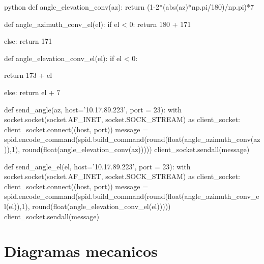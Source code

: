 \begin{appendixs}
\begin{sourcecode}[]{python}{}
def angle_elevation_conv(az):
    return (1-2*(abs(az)*np.pi/180)/np.pi)*7

def angle_azimuth_conv_el(el):
    if el < 0:
        return 180 + 171

    else:
        return 171

def angle_elevation_conv_el(el):
    if el < 0:
        
        return 173 + el

    else:
        return el + 7
        

def send_angle(az, host='10.17.89.223', port = 23):
    with socket.socket(socket.AF_INET, socket.SOCK_STREAM) as client_socket:
        client_socket.connect((host, port))
        message = spid.encode_command(spid.build_command(round(float(angle_azimuth_conv(az)),1), round(float(angle_elevation_conv(az)))))
        client_socket.sendall(message)

def send_angle_el(el, host='10.17.89.223', port = 23):
    with socket.socket(socket.AF_INET, socket.SOCK_STREAM) as client_socket:
        client_socket.connect((host, port))
        message = spid.encode_command(spid.build_command(round(float(angle_azimuth_conv_el(el)),1), round(float(angle_elevation_conv_el(el)))))
        client_socket.sendall(message)

\end{sourcecode}

\newpage

\section{Diagramas mecanicos}


\end{appendixs}
